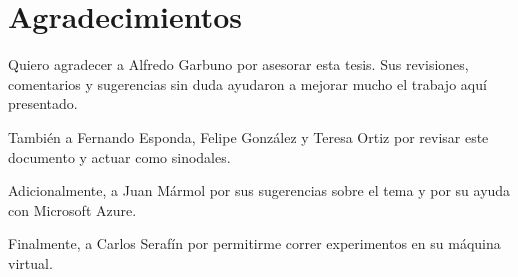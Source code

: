 \chapter*{Agradecimientos}

Quiero agradecer a Alfredo Garbuno por asesorar esta tesis. Sus revisiones, comentarios y sugerencias sin duda ayudaron a mejorar mucho el trabajo aquí presentado.

También a Fernando Esponda, Felipe González y Teresa Ortiz por revisar este documento y actuar como sinodales.

Adicionalmente, a Juan Mármol por sus sugerencias sobre el tema y por su ayuda con Microsoft Azure.

Finalmente, a Carlos Serafín por permitirme correr experimentos en su máquina virtual.


